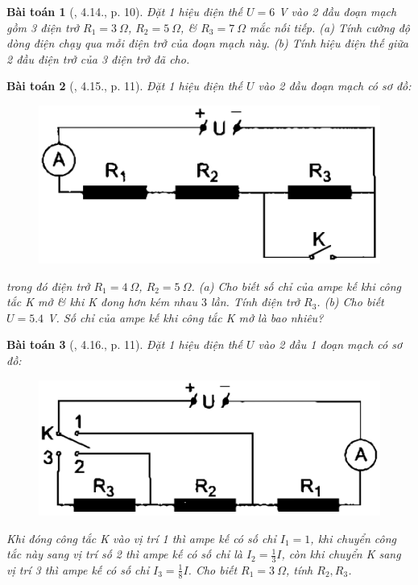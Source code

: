 \documentclass{article}
\newtheorem{baitoan}{Bài toán}
\begin{document}
\begin{baitoan}[\cite{SBT_Vat_Ly_9}, 4.14., p. 10]
	Đặt 1 hiệu điện thế $U = 6$ \emph{V} vào 2 đầu đoạn mạch gồm 3 điện trở $R_1 = 3\ \Omega$, $R_2 = 5\ \Omega$, \& $R_3 = 7\ \Omega$ mắc nối tiếp. (a) Tính cường độ dòng điện chạy qua mỗi điện trở của đoạn mạch này. (b) Tính hiệu điện thế giữa 2 đầu điện trở của 3 điện trở đã cho.
\end{baitoan}

\begin{baitoan}[\cite{SBT_Vat_Ly_9}, 4.15., p. 11]
	Đặt 1 hiệu điện thế $U$ vào 2 đầu đoạn mạch có sơ đồ:
	\begin{figure}[H]
		\centering
		\includegraphics[scale=0.25]{SBT_4.4}
	\end{figure}
	\noindent trong đó điện trở $R_1 = 4\ \Omega$, $R_2 = 5\ \Omega$. (a) Cho biết số chỉ của ampe kế khi công tắc K mở \& khi K đong hơn kém nhau $3$ lần. Tính điện trở $R_3$. (b) Cho biết $U = 5.4$ \emph{V}. Số chỉ của ampe kế khi công tắc K mở là bao nhiêu?
\end{baitoan}

\begin{baitoan}[\cite{SBT_Vat_Ly_9}, 4.16., p. 11]
	Đặt 1 hiệu điện thế $U$ vào 2 đầu 1 đoạn mạch có sơ đồ:
	\begin{figure}[H]
		\centering
		\includegraphics[scale=0.25]{SBT_4.5}
	\end{figure}
	\noindent Khi đóng công tắc K vào vị trí 1 thì ampe kế có số chỉ $I_1 = 1$, khi chuyển công tắc này sang vị trí số 2 thì ampe kế có số chỉ là $I_2 = \frac{1}{3}I$, còn khi chuyển K sang vị trí 3 thì ampe kế có số chỉ $I_3 = \frac{1}{8}I$. Cho biết $R_1 = 3\ \Omega$, tính $R_2,R_3$.
\end{baitoan}
\end{document}
